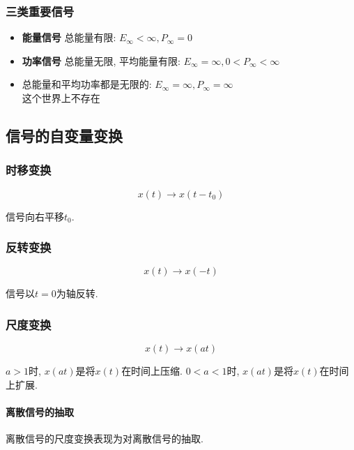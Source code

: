         \subsubsection{三类重要信号}
        
        \begin{itemize}
            \item \textbf{能量信号} 总能量有限: $E_\infty<\infty, P_\infty=0$
            \item \textbf{功率信号} 总能量无限, 平均能量有限: $E_\infty=\infty, 0<P_\infty<\infty$
            \item 总能量和平均功率都是无限的: $E_\infty=\infty, P_\infty=\infty$ \\
                这个世界上不存在
        \end{itemize}

    \subsection{信号的自变量变换}

        \subsubsection{时移变换}

            \[x(t)\to x(t-t_0)\]

            信号向右平移$t_0$.

        \subsubsection{反转变换}

            \[x(t)\to x(-t)\]

            信号以$t=0$为轴反转.

        \subsubsection{尺度变换}

            \[x(t)\to x(at)\]

            $a>1$时, $x(at)$是将$x(t)$在时间上压缩. $0<a<1$时, $x(at)$是将$x(t)$在时间上扩展.

            \paragraph{离散信号的抽取}

                离散信号的尺度变换表现为对离散信号的抽取.

